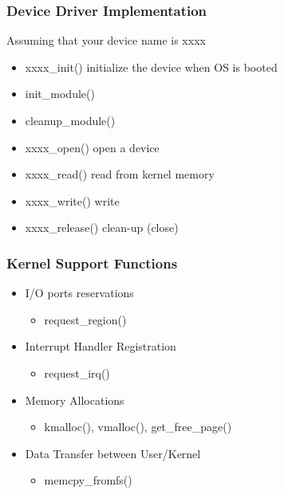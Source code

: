 % 
% 
\begin{frame}[fragile]
    \frametitle{Device Driver Implementation}
Assuming that your device name is xxxx
    \begin{itemize}
        \item xxxx\_init() initialize the device when OS is booted
        \item init\_module()
        \item cleanup\_module() \pause
        \item xxxx\_open() open a device 
        \item xxxx\_read() read from kernel memory 
        \item xxxx\_write() write 
        \item xxxx\_release() clean-up (close)
    \end{itemize}
\end{frame}
% 
% 
\begin{frame}[fragile]
    \frametitle{Kernel Support Functions}
    \begin{itemize}
        \item I/O ports reservations
        \begin{itemize}
            \item request\_region()
        \end{itemize}
        \item Interrupt Handler Registration
        \begin{itemize}
            \item request\_irq()
        \end{itemize} \pause
        \item Memory Allocations   
        \begin{itemize}
            \item kmalloc(), vmalloc(), get\_free\_page()
        \end{itemize} \pause
        \item Data Transfer between User/Kernel
        \begin{itemize}
            \item memcpy\_fromfs()
        \end{itemize}
    \end{itemize}
\end{frame}
